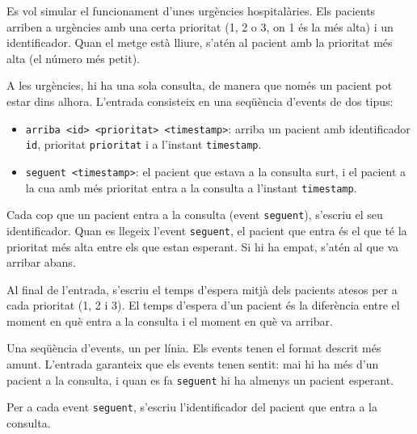 

\Statement

Es vol simular el funcionament d'unes urgències hospitalàries.
Els pacients arriben a urgències amb una certa prioritat (1, 2 o
3, on 1 és la més alta) i un identificador. Quan el metge està
lliure, s'atén al pacient amb la prioritat més alta (el número
més petit).

\medskip

A les urgències, hi ha una sola consulta, de manera que només un
pacient pot estar dins alhora. L'entrada consisteix en una
seqüència d'events de dos tipus:

\begin{itemize}

\item \verb|arriba <id> <prioritat> <timestamp>|: arriba un
pacient amb identificador \verb|id|, prioritat \verb|prioritat| i
a l'instant \verb|timestamp|.

\item \verb|seguent <timestamp>|: el pacient que estava a la
consulta surt, i el pacient a la cua amb més prioritat entra a la
consulta a l'instant \verb|timestamp|.

\end{itemize}

\medskip

Cada cop que un pacient entra a la consulta (event
\verb|seguent|), s'escriu el seu identificador. Quan es llegeix
l'event \verb|seguent|, el pacient que entra és el que té la
prioritat més alta entre els que estan esperant. Si hi ha empat,
s'atén al que va arribar abans.

\medskip

Al final de l'entrada, s'escriu el temps d'espera mitjà dels
pacients atesos per a cada prioritat (1, 2 i 3). El temps
d'espera d'un pacient és la diferència entre el moment en què
entra a la consulta i el moment en què va arribar.

\Input

Una seqüència d'events, un per línia. Els events tenen el format
descrit més amunt. L'entrada garanteix que els events tenen
sentit: mai hi ha més d'un pacient a la consulta, i quan es fa
\verb|seguent| hi ha almenys un pacient esperant.

\Output

Per a cada event \verb|seguent|, s'escriu l'identificador del
pacient que entra a la consulta.

\medskip

